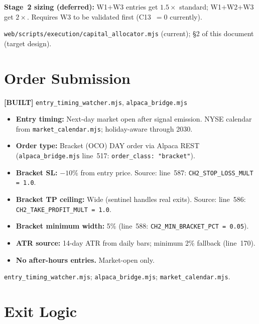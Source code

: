 \documentclass[11pt,a4paper]{article}
\newcommand{\statusbuilt}{\textcolor{statusbuilt}{\textbf{[BUILT]}}}
\newcommand{\code}[1]{\texttt{\small#1}}
\begin{document}
\textbf{Stage~2 sizing (deferred):} W1$+$W3 entries get $1.5\times$ standard; W1$+$W2$+$W3 get $2\times$. Requires W3 to be validated first (C13~$= 0$ currently).

\begin{sourcebox}
\texttt{web/scripts/execution/capital\_allocator.mjs} (current); §2 of this document (target design).
\end{sourcebox}

\section{Order Submission}

\statusbuilt{} \texttt{entry\_timing\_watcher.mjs}, \texttt{alpaca\_bridge.mjs}

\begin{itemize}
  \item \textbf{Entry timing:} Next-day market open after signal emission. NYSE calendar from \texttt{market\_calendar.mjs}; holiday-aware through 2030.
  \item \textbf{Order type:} Bracket (OCO) DAY order via Alpaca REST (\texttt{alpaca\_bridge.mjs} line~517: \code{order\_class: "bracket"}).
  \item \textbf{Bracket SL:} $-10\%$ from entry price. Source: line~587: \code{CH2\_STOP\_LOSS\_MULT = 1.0}.
  \item \textbf{Bracket TP ceiling:} Wide (sentinel handles real exits). Source: line~586: \code{CH2\_TAKE\_PROFIT\_MULT = 1.0}.
  \item \textbf{Bracket minimum width:} 5\% (line~588: \code{CH2\_MIN\_BRACKET\_PCT = 0.05}).
  \item \textbf{ATR source:} 14-day ATR from daily bars; minimum 2\% fallback (line~170).
  \item \textbf{No after-hours entries.} Market-open only.
\end{itemize}

\begin{sourcebox}
\texttt{entry\_timing\_watcher.mjs}; \texttt{alpaca\_bridge.mjs}; \texttt{market\_calendar.mjs}.
\end{sourcebox}

\section{Exit Logic}
\end{document}
